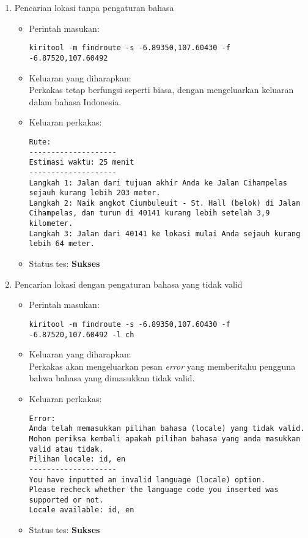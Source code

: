\begin{enumerate}
	\item Pencarian lokasi tanpa pengaturan bahasa
	\begin{itemize}
		\item Perintah masukan:
		\begin{verbatim}
kiritool -m findroute -s -6.89350,107.60430 -f -6.87520,107.60492
		\end{verbatim}
		\item Keluaran yang diharapkan: \\
		Perkakas tetap berfungsi seperti biasa, dengan mengeluarkan keluaran dalam bahasa Indonesia.
		\item Keluaran perkakas:
		\begin{lstlisting}
Rute:
--------------------
Estimasi waktu: 25 menit 
--------------------
Langkah 1: Jalan dari tujuan akhir Anda ke Jalan Cihampelas sejauh kurang lebih 203 meter.
Langkah 2: Naik angkot Ciumbuleuit - St. Hall (belok) di Jalan Cihampelas, dan turun di 40141 kurang lebih setelah 3,9 kilometer.
Langkah 3: Jalan dari 40141 ke lokasi mulai Anda sejauh kurang lebih 64 meter.
		\end{lstlisting}
		\item Status tes: \textbf{Sukses}
	\end{itemize}
	
	\item Pencarian lokasi dengan pengaturan bahasa yang tidak valid
	\begin{itemize}
		\item Perintah masukan:
		\begin{verbatim}
kiritool -m findroute -s -6.89350,107.60430 -f -6.87520,107.60492 -l ch
		\end{verbatim}
		\item Keluaran yang diharapkan: \\
		Perkakas akan mengeluarkan pesan \textit{error} yang memberitahu pengguna bahwa bahasa yang dimasukkan tidak valid.
		\item Keluaran perkakas:
		\begin{lstlisting}
Error:
Anda telah memasukkan pilihan bahasa (locale) yang tidak valid.
Mohon periksa kembali apakah pilihan bahasa yang anda masukkan valid atau tidak.
Pilihan locale: id, en
--------------------
You have inputted an invalid language (locale) option.
Please recheck whether the language code you inserted was supported or not.
Locale available: id, en
		\end{lstlisting}
		\item Status tes: \textbf{Sukses}
	\end{itemize}
	
\end{enumerate}

